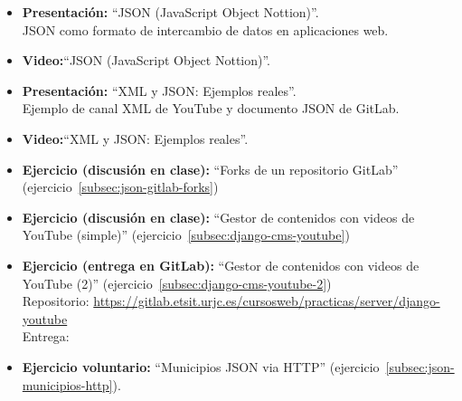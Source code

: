 \documentclass[a4paper,12pt]{article}
\begin{document}
\begin{itemize}
\item \textbf{Presentación:} ``JSON (JavaScript Object Nottion)''. \\
  JSON como formato de intercambio de datos en aplicaciones web.
\item \textbf{Video:}``JSON (JavaScript Object Nottion)''.
\item \textbf{Presentación:} ``XML y JSON: Ejemplos reales''. \\
  Ejemplo de canal XML de YouTube y documento JSON de GitLab.
\item \textbf{Video:}``XML y JSON: Ejemplos reales''.
\item \textbf{Ejercicio (discusión en clase):} ``Forks de un repositorio GitLab''
  (ejercicio~\ref{subsec:json-gitlab-forks})
\item \textbf{Ejercicio (discusión en clase):} ``Gestor de contenidos con videos de YouTube (simple)'' (ejercicio~\ref{subsec:django-cms-youtube})
\item \textbf{Ejercicio (entrega en GitLab):} ``Gestor de contenidos con videos de YouTube (2)'' (ejercicio~\ref{subsec:django-cms-youtube-2}) \\
  Repositorio: \url{https://gitlab.etsit.urjc.es/cursosweb/practicas/server/django-youtube} \\
  Entrega: \juevesL
\item \textbf{Ejercicio voluntario:} ``Municipios JSON via HTTP'' (ejercicio~\ref{subsec:json-municipios-http}).
\end{itemize}

\end{document}
